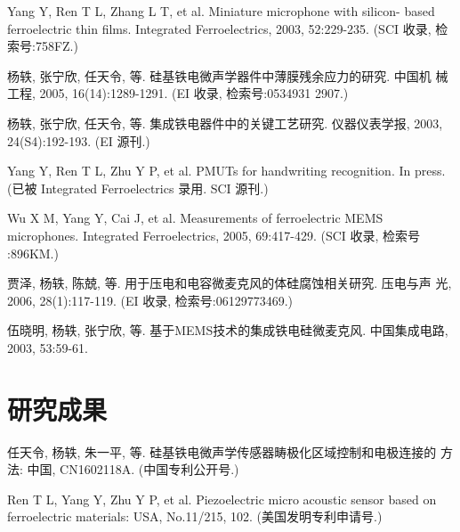 \begin{resume}
  \begin{enumerate}[label={[\arabic*]}, leftmargin=0pt, itemindent=4em]
  \addtolength{\itemsep}{-.36\baselineskip}%
  \item Yang Y, Ren T L, Zhang L T, et al. Miniature microphone with silicon-
    based ferroelectric thin films. Integrated Ferroelectrics, 2003,
    52:229-235. (SCI 收录, 检索号:758FZ.)
  \item 杨轶, 张宁欣, 任天令, 等. 硅基铁电微声学器件中薄膜残余应力的研究. 中国机
    械工程, 2005, 16(14):1289-1291. (EI 收录, 检索号:0534931 2907.)
  \item 杨轶, 张宁欣, 任天令, 等. 集成铁电器件中的关键工艺研究. 仪器仪表学报,
    2003, 24(S4):192-193. (EI 源刊.)
  \item Yang Y, Ren T L, Zhu Y P, et al. PMUTs for handwriting recognition. In
    press. (已被 Integrated Ferroelectrics 录用. SCI 源刊.)
  \item Wu X M, Yang Y, Cai J, et al. Measurements of ferroelectric MEMS
    microphones. Integrated Ferroelectrics, 2005, 69:417-429. (SCI 收录, 检索号
    :896KM.)
  \item 贾泽, 杨轶, 陈兢, 等. 用于压电和电容微麦克风的体硅腐蚀相关研究. 压电与声
    光, 2006, 28(1):117-119. (EI 收录, 检索号:06129773469.)
  \item 伍晓明, 杨轶, 张宁欣, 等. 基于MEMS技术的集成铁电硅微麦克风. 中国集成电路,
    2003, 53:59-61.
  \end{enumerate}

  \section*{研究成果} %
  \begin{enumerate}[label=\textbf{[\arabic*]}, leftmargin=0pt, itemindent=4em]
  \addtolength{\itemsep}{-.36\baselineskip}%
  \item 任天令, 杨轶, 朱一平, 等. 硅基铁电微声学传感器畴极化区域控制和电极连接的
    方法: 中国, CN1602118A. (中国专利公开号.)
  \item Ren T L, Yang Y, Zhu Y P, et al. Piezoelectric micro acoustic sensor
    based on ferroelectric materials: USA, No.11/215, 102. (美国发明专利申请号.)
  \end{enumerate}
\fi
\fi
\end{resume}

